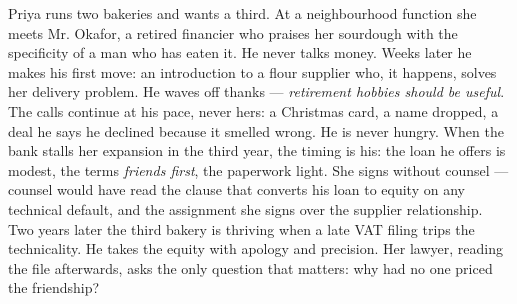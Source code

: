 

\begin{story}
Priya runs two bakeries and wants a third. At a neighbourhood function she meets Mr. Okafor, a retired financier who praises her sourdough with the specificity of a man who has eaten it. He never talks money. Weeks later he makes his first move: an introduction to a flour supplier who, it happens, solves her delivery problem. He waves off thanks --- \emph{retirement hobbies should be useful}. The calls continue at his pace, never hers: a Christmas card, a name dropped, a deal he says he declined because it smelled wrong. He is never hungry. When the bank stalls her expansion in the third year, the timing is his: the loan he offers is modest, the terms \emph{friends first}, the paperwork light. She signs without counsel --- counsel would have read the clause that converts his loan to equity on any technical default, and the assignment she signs over the supplier relationship. Two years later the third bakery is thriving when a late VAT filing trips the technicality. He takes the equity with apology and precision. Her lawyer, reading the file afterwards, asks the only question that matters: why had no one priced the friendship?
\end{story}

